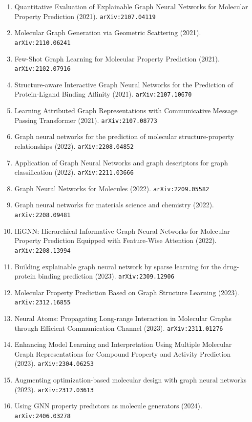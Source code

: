 \documentclass[11pt]{article}
\begin{document}
\begin{enumerate}
  \item Quantitative Evaluation of Explainable Graph Neural Networks for
  Molecular Property Prediction (2021). \texttt{arXiv:2107.04119}
  \item Molecular Graph Generation via Geometric Scattering (2021). \texttt{arXiv:2110.06241}
  \item Few-Shot Graph Learning for Molecular Property Prediction (2021). \texttt{arXiv:2102.07916}
  \item Structure-aware Interactive Graph Neural Networks for the Prediction of
  Protein-Ligand Binding Affinity (2021). \texttt{arXiv:2107.10670}
  \item Learning Attributed Graph Representations with Communicative Message
  Passing Transformer (2021). \texttt{arXiv:2107.08773}
  \item Graph neural networks for the prediction of molecular structure-property
  relationships (2022). \texttt{arXiv:2208.04852}
  \item Application of Graph Neural Networks and graph descriptors for graph
  classification (2022). \texttt{arXiv:2211.03666}
  \item Graph Neural Networks for Molecules (2022). \texttt{arXiv:2209.05582}
  \item Graph neural networks for materials science and chemistry (2022). \texttt{arXiv:2208.09481}
  \item HiGNN: Hierarchical Informative Graph Neural Networks for Molecular
  Property Prediction Equipped with Feature-Wise Attention (2022). \texttt{arXiv:2208.13994}
  \item Building explainable graph neural network by sparse learning for the
  drug-protein binding prediction (2023). \texttt{arXiv:2309.12906}
  \item Molecular Property Prediction Based on Graph Structure Learning (2023). \texttt{arXiv:2312.16855}
  \item Neural Atoms: Propagating Long-range Interaction in Molecular Graphs
  through Efficient Communication Channel (2023). \texttt{arXiv:2311.01276}
  \item Enhancing Model Learning and Interpretation Using Multiple Molecular
  Graph Representations for Compound Property and Activity Prediction (2023). \texttt{arXiv:2304.06253}
  \item Augmenting optimization-based molecular design with graph neural
  networks (2023). \texttt{arXiv:2312.03613}
  \item Using GNN property predictors as molecule generators (2024). \texttt{arXiv:2406.03278}

\end{enumerate}
\end{document}
